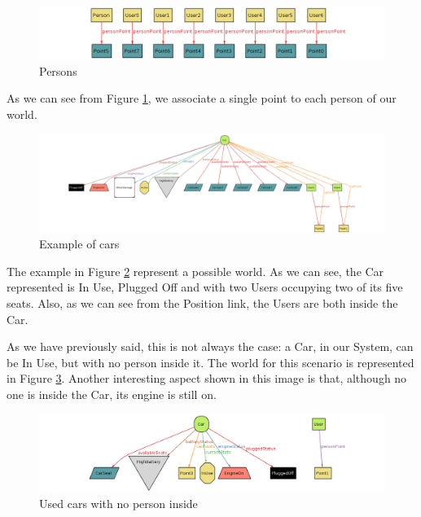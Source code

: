 \begin{figure}[!htbp]
\centering
\includegraphics[width=\linewidth,keepaspectratio]{../Alloy/Exported/Images/Persons.png}
\caption{Persons}
\label{fig:Persons}
\end{figure}
As we can see from Figure \ref{fig:Persons}, we associate a single point to each person of our world.

\begin{figure}[!htbp]
\centering
\includegraphics[width=\linewidth,keepaspectratio]{../Alloy/Exported/Images/Cars_1.png}
\caption{Example of cars}
\label{fig:Cars1}
\end{figure}
\FloatBarrier
The example in Figure \ref{fig:Cars1} represent a possible world. As we can see, the Car represented is In Use, Plugged Off and with two Users occupying two of its five seats. Also, as we can see from the Position link, the Users are both inside the Car. 

As we have previously said, this is not always the case: a Car, in our System, can be In Use, but with no person inside it. The world for this scenario is represented in Figure \ref{fig:CarsNoneInside}. Another interesting aspect shown in this image is that, although no one is inside the Car, its engine is still on.

\begin{figure}[!htbp]
\centering
\includegraphics[width=\linewidth,keepaspectratio]{../Alloy/Exported/Images/Cars_NoPersonInsideInUseCar.png}
\caption{Used cars with no person inside}
\label{fig:CarsNoneInside}
\end{figure}
\FloatBarrier

